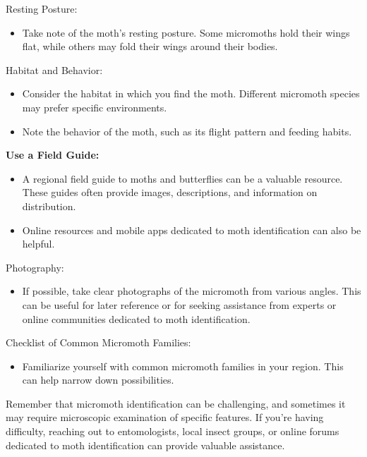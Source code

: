 \documentclass[
  ignorenonframetext,
]{beamer}
\providecommand{\tightlist}{%
  \setlength{\itemsep}{0pt}\setlength{\parskip}{0pt}}
\begin{document}
\begin{frame}{Resting Posture:}
\protect\hypertarget{resting-posture}{}
\begin{itemize}
\tightlist
\item
  Take note of the moth's resting posture. Some micromoths hold their
  wings flat, while others may fold their wings around their bodies.
\end{itemize}
\end{frame}

\begin{frame}{Habitat and Behavior:}
\protect\hypertarget{habitat-and-behavior}{}
\begin{itemize}
\tightlist
\item
  Consider the habitat in which you find the moth. Different micromoth
  species may prefer specific environments.
\item
  Note the behavior of the moth, such as its flight pattern and feeding
  habits.
\end{itemize}
\end{frame}

\begin{frame}{\textbf{Use a Field Guide:}}
\protect\hypertarget{use-a-field-guide}{}
\begin{itemize}
\tightlist
\item
  A regional field guide to moths and butterflies can be a valuable
  resource. These guides often provide images, descriptions, and
  information on distribution.
\item
  Online resources and mobile apps dedicated to moth identification can
  also be helpful.
\end{itemize}
\end{frame}

\begin{frame}{Photography:}
\protect\hypertarget{photography}{}
\begin{itemize}
\tightlist
\item
  If possible, take clear photographs of the micromoth from various
  angles. This can be useful for later reference or for seeking
  assistance from experts or online communities dedicated to moth
  identification.
\end{itemize}
\end{frame}

\begin{frame}{Checklist of Common Micromoth Families:}
\protect\hypertarget{checklist-of-common-micromoth-families}{}
\begin{itemize}
\tightlist
\item
  Familiarize yourself with common micromoth families in your region.
  This can help narrow down possibilities.
\end{itemize}

Remember that micromoth identification can be challenging, and sometimes
it may require microscopic examination of specific features. If you're
having difficulty, reaching out to entomologists, local insect groups,
or online forums dedicated to moth identification can provide valuable
assistance.
\end{frame}
\end{document}
